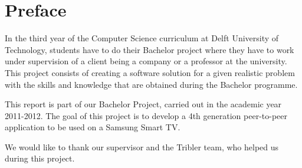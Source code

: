 \chapter*{Preface}
In the third year of the Computer Science curriculum at Delft University of Technology, students have to do their Bachelor project where they have to work under supervision of a client being a company or a professor at the university. This project consists of creating a software solution for a given realistic problem with the skills and knowledge that are obtained during the Bachelor programme.

This report is part of our Bachelor Project, carried out in the academic year 2011-2012. The goal of this project is to develop a 4th generation peer-to-peer application to be used on a Samsung Smart TV.

We would like to thank our supervisor and the Tribler team, who helped us during this project.